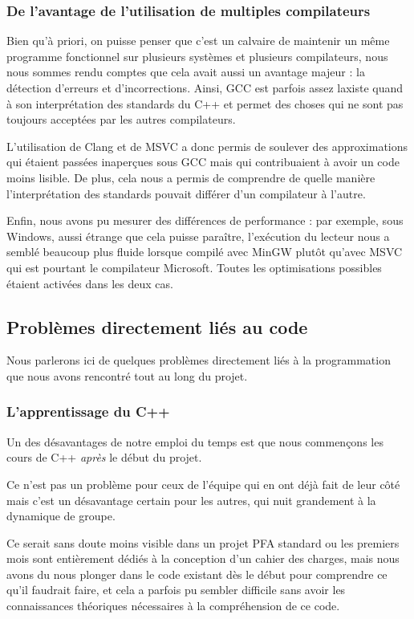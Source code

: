 \subsubsection*{De l'avantage de l'utilisation de multiples compilateurs}

Bien qu'à priori, on puisse penser que c'est un calvaire de maintenir un même programme fonctionnel sur plusieurs systèmes et plusieurs compilateurs, nous nous sommes rendu comptes que cela avait aussi un avantage majeur : la détection d'erreurs et d'incorrections.
Ainsi, \ac{GCC} est parfois assez laxiste quand à son interprétation des standards du C++ et permet des choses qui ne sont pas toujours acceptées par les autres compilateurs.

L'utilisation de Clang et de \ac{MSVC} a donc permis de soulever des approximations qui étaient passées inaperçues sous \ac{GCC} mais qui contribuaient à avoir un code moins lisible.
De plus, cela nous a permis de comprendre de quelle manière l'interprétation des standards pouvait différer d'un compilateur à l'autre.

Enfin, nous avons pu mesurer des différences de performance : par exemple, sous Windows, aussi étrange que cela puisse paraître, l'exécution du lecteur nous a semblé beaucoup plus fluide lorsque compilé avec MinGW plutôt qu'avec \ac{MSVC} qui est pourtant le compilateur Microsoft. Toutes les optimisations possibles étaient activées dans les deux cas.

\subsection{Problèmes directement liés au code}
Nous parlerons ici de quelques problèmes directement liés à la programmation que nous avons rencontré tout au long du projet.

\subsubsection{L'apprentissage du C++}
Un des désavantages de notre emploi du temps est que nous commençons les cours de C++ \textit{après} le début du projet.

Ce n'est pas un problème pour ceux de l'équipe qui en ont déjà fait de leur côté mais c'est un désavantage certain pour les autres,
qui nuit grandement à la dynamique de groupe.

Ce serait sans doute moins visible dans un projet PFA standard ou les premiers mois sont entièrement dédiés à la conception
d'un cahier des charges, mais nous avons du nous plonger dans le code existant dès le début pour comprendre ce qu'il faudrait faire, et cela a parfois pu sembler difficile sans avoir les connaissances théoriques nécessaires à la compréhension de ce code.

